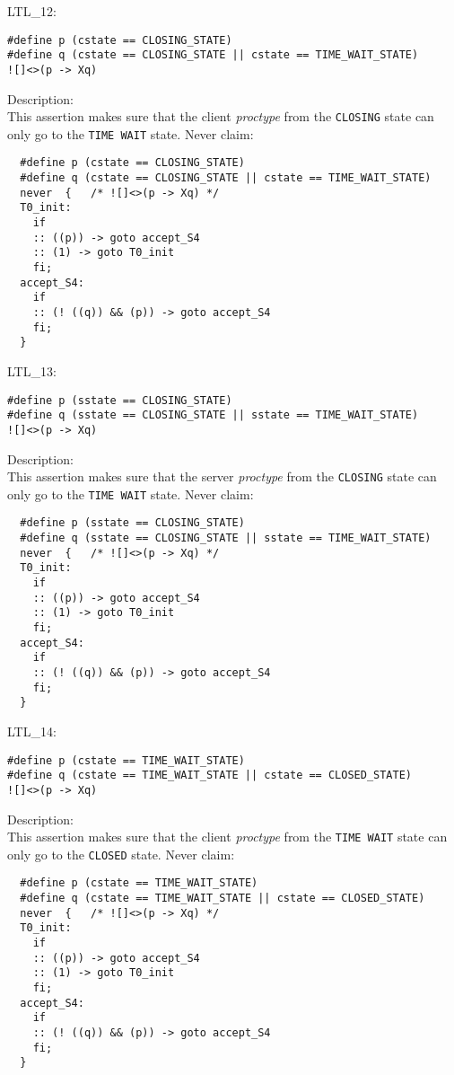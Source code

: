 \documentclass{WigReport} \usepackage{epsfig} %
\begin{document}
LTL\_12:\\
\begin{lstlisting}
#define p (cstate == CLOSING_STATE)
#define q (cstate == CLOSING_STATE || cstate == TIME_WAIT_STATE)
![]<>(p -> Xq)
\end{lstlisting}
Description:\\
This assertion makes sure that the client \textit{proctype} from the
\verb|CLOSING| state can only go to the \verb|TIME WAIT| state.
Never claim:\\
\begin{lstlisting}
  #define p (cstate == CLOSING_STATE)
  #define q (cstate == CLOSING_STATE || cstate == TIME_WAIT_STATE)
  never  {   /* ![]<>(p -> Xq) */
  T0_init:
    if
    :: ((p)) -> goto accept_S4
    :: (1) -> goto T0_init
    fi;
  accept_S4:
    if
    :: (! ((q)) && (p)) -> goto accept_S4
    fi;
  }
\end{lstlisting}


LTL\_13:\\
\begin{lstlisting}
#define p (sstate == CLOSING_STATE)
#define q (sstate == CLOSING_STATE || sstate == TIME_WAIT_STATE)
![]<>(p -> Xq)
\end{lstlisting}
Description:\\
This assertion makes sure that the server \textit{proctype} from the
\verb|CLOSING| state can only go to the \verb|TIME WAIT| state.
Never claim:\\
\begin{lstlisting}
  #define p (sstate == CLOSING_STATE)
  #define q (sstate == CLOSING_STATE || sstate == TIME_WAIT_STATE)
  never  {   /* ![]<>(p -> Xq) */
  T0_init:
    if
    :: ((p)) -> goto accept_S4
    :: (1) -> goto T0_init
    fi;
  accept_S4:
    if
    :: (! ((q)) && (p)) -> goto accept_S4
    fi;
  }
\end{lstlisting}


LTL\_14:\\
\begin{lstlisting}
#define p (cstate == TIME_WAIT_STATE)
#define q (cstate == TIME_WAIT_STATE || cstate == CLOSED_STATE)
![]<>(p -> Xq)
\end{lstlisting}
Description:\\
This assertion makes sure that the client \textit{proctype} from the
\verb|TIME WAIT| state can only go to the \verb|CLOSED| state.
Never claim:\\
\begin{lstlisting}
  #define p (cstate == TIME_WAIT_STATE)
  #define q (cstate == TIME_WAIT_STATE || cstate == CLOSED_STATE)
  never  {   /* ![]<>(p -> Xq) */
  T0_init:
    if
    :: ((p)) -> goto accept_S4
    :: (1) -> goto T0_init
    fi;
  accept_S4:
    if
    :: (! ((q)) && (p)) -> goto accept_S4
    fi;
  }
\end{lstlisting}
\end{document}
